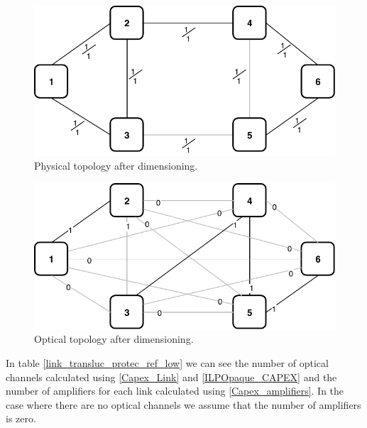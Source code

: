 \begin{figure}[h!]
\centering
\includegraphics[width=12cm]{sdf/ilp/translucent_protection/figures/physical_topology}
\caption{Physical topology after dimensioning.}
\label{physical3_protectionlow}
\end{figure}
\newpage
\begin{figure}[h!]
\centering
\includegraphics[width=12cm]{sdf/ilp/translucent_protection/figures/optical_topology_low}
\caption{Optical topology after dimensioning.}
\label{optical3_protectionlow}
\end{figure}

\vspace{15pt}
In table \ref{link_transluc_protec_ref_low} we can see the number of optical channels calculated using \ref{Capex_Link} and \ref{ILPOpaque_CAPEX} and the number of amplifiers for each link calculated using \ref{Capex_amplifiers}. In the case where there are no optical channels we assume that the number of amplifiers is zero.\\

